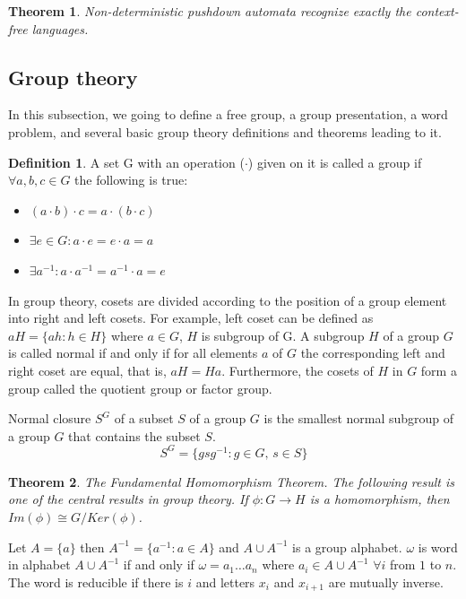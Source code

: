 \documentclass[conference]{IEEEtran}
\newtheorem{thm}{Theorem}[section]
\theoremstyle{definition}
\newtheorem{defn}{Definition}[section]
\begin{document}
\begin{thm} \label{thmpda}
Non-deterministic pushdown automata recognize exactly the context-free languages.
\end{thm}

\subsection{Group theory}

In this subsection, we going to define a free group, a group presentation,
a word problem, and several basic group theory definitions and theorems leading to it.

\begin{defn}
A set G with an operation ($\cdot$) given on it is called a group if $\forall a, b, c \in G$
the following is true:
\begin{itemize}
\item $(a \cdot b) \cdot c = a \cdot (b \cdot c)$
\item $\exists e \in G : a \cdot e = e \cdot a = a$
\item $\exists a^{-1} : a \cdot a^{-1} = a^{-1} \cdot a = e$
\end{itemize}
\end{defn}

In group theory, cosets are divided according to the position of a group element
into right and left cosets. For example, left coset can be defined as $aH = \{ ah : h \in H \}$
where $a \in G$, $H$ is subgroup of G.
A subgroup $H$ of a group $G$ is called normal if and only if for all
elements $a$ of $G$ the corresponding left and right coset are equal,
that is, $aH= Ha$. Furthermore, the cosets of $H$ in $G$ form a group
called the quotient group or factor group.

Normal closure $S^G$ of a subset $S$ of a group $G$ is the smallest normal subgroup
of a group $G$ that contains the subset $S$.
\begin{equation}
    S^G = \{ gsg^{-1} : g \in G,\, s \in S \}
\end{equation}

\begin{thm}
The Fundamental Homomorphism Theorem.
The following result is one of the central results in group theory.
If $\phi: G \to H$ is a homomorphism, then $Im(\phi) \cong G/Ker(\phi)$.
\end{thm}

Let $A = \{ a \}$ then $A^{-1} = \{ a^{-1} : a \in A \}$ and $A \cup A^{-1}$ is a group alphabet.
$\omega$ is word in alphabet $A \cup A^{-1}$ if and only if $\omega = a_1 \dots a_n$
where $a_i \in A \cup A^{-1}$ $\forall i$ from $1$ to $n$.
The word is reducible if there is $i$ and letters $x_i$ and $x_{i+1}$ are mutually inverse.
\end{document}
